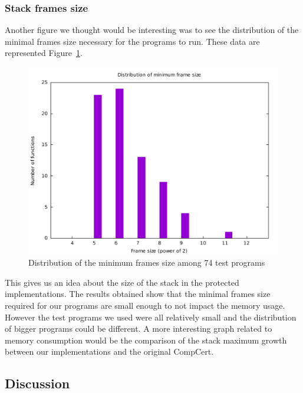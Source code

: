 \documentclass[11pt]{sdm}
\begin{document}
\subsubsection{Stack frames size}
\label{ssub:Stack frames size}

Another figure we thought would be interesting was to see the distribution of the minimal frames size necessary for the programs to run. These data are represented Figure~\ref{frame_size_graph}.

\begin{figure}[!ht]
\centering
\includegraphics[width=1\textwidth]{images/frame_size_graph.pdf}
\caption{Distribution of the minimum frames size among 74 test programs}
\label{frame_size_graph}
\end{figure}

This gives us an idea about the size of the stack in the protected implementations. The results obtained show that the minimal frames size required for our programs are small enough to not impact the memory usage. However the test programs we used were all relatively small and the distribution of bigger programs could be different.
A more interesting graph related to memory consumption would be the comparison of the stack maximum growth between our implementations and the original CompCert. 

\subsection{Discussion}
\end{document}
